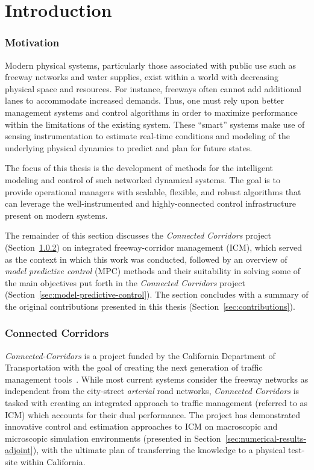 \chapter{Introduction}
\label{sec:introduction}

\subsection{Motivation}
\label{sec:motivation}


Modern physical systems, particularly those associated with public use such as freeway networks and water supplies, exist within a world with decreasing physical space and resources. For instance, freeways often cannot add additional lanes to accommodate increased demands. Thus, one must rely upon better management systems and control algorithms in order to maximize performance within the limitations of the existing system. These ``smart'' systems make use of sensing instrumentation to estimate real-time conditions and modeling of the underlying physical dynamics to predict and plan for future states.

The focus of this thesis is the development of methods for the intelligent modeling and control of such networked dynamical systems. The goal is to provide operational managers with scalable, flexible, and robust algorithms that can leverage the well-instrumented and highly-connected control infrastructure present on modern systems. 

The remainder of this section discusses the \emph{Connected Corridors} project (Section~\ref{sec:connected-corridors}) on integrated freeway-corridor management (ICM), which served as the context in which this work was conducted, followed by an overview of \emph{model predictive control} (MPC) methods and their suitability in solving some of the main objectives put forth in the \emph{Connected Corridors} project (Section~\ref{sec:model-predictive-control}). The section concludes with a summary of the original contributions presented in this thesis (Section~\ref{sec:contributions}).

\subsection{Connected Corridors}
\label{sec:connected-corridors}

\emph{Connected-Corridors} is a project funded by the California Department of Transportation with the goal of creating the next generation of traffic management tools~\cite{connected-corridors,miller2010san}. While most current systems consider the freeway networks as independent from the city-street \emph{arterial} road networks, \emph{Connected Corridors} is tasked with creating an integrated approach to traffic management (referred to as ICM) which accounts for their dual performance. The project has demonstrated innovative control and estimation approaches to ICM on macroscopic and microscopic simulation environments (presented in Section~\ref{sec:numerical-results-adjoint}), with the ultimate plan of transferring the knowledge to a physical test-site within California.

